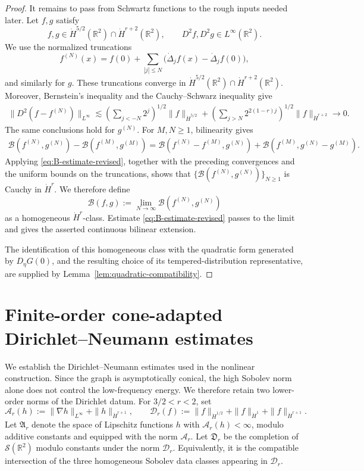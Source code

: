 \documentclass[12pt]{amsart}
\theoremstyle{remark}
\theoremstyle{definition}
\numberwithin{equation}{section}
\newcommand{\R}{\mathbb{R}}
\begin{document}
\begin{proof}
It remains to pass from Schwartz functions to the rough inputs needed
later. Let \(f,g\) satisfy
\[
 f,g\in\dot H^{5/2}(\R^2)\cap\dot H^{r+2}(\R^2),
 \qquad
 D^2f,D^2g\in L^\infty(\R^2).
\]
We use the normalized truncations
\[
 f^{(N)}(x)=f(0)+\sum_{|j|\leq N}
 \bigl(\dot\Delta_jf(x)-\dot\Delta_jf(0)\bigr),
\]
and similarly for \(g\). 
These truncations converge in
\(
 \dot H^{5/2}(\R^2)\cap\dot H^{r+2}(\R^2)
\).
Moreover, Bernstein's inequality and the Cauchy--Schwarz inequality
give
\begin{align*}
 \|D^2(f-f^{(N)})\|_{L^\infty}
 \lesssim \left(
  \sum_{j<-N}2^j \right)^{1/2} \|f\|_{\dot H^{5/2}}+ \left( \sum_{j>N}2^{2(1-r)j}
 \right)^{1/2} \|f\|_{\dot H^{r+2}}
 \longrightarrow 0.
\end{align*}
The same conclusions hold for \(g^{(N)}\). For \(M,N\geq1\), bilinearity gives
\begin{align*}
\mathcal B(f^{(N)},g^{(N)})
 - \mathcal B(f^{(M)},g^{(M)})=
 \mathcal B(f^{(N)}-f^{(M)},g^{(N)})
 + \mathcal B(f^{(M)},g^{(N)}-g^{(M)}).
\end{align*}
Applying \eqref{eq:B-estimate-revised}, together with the preceding
convergences and the uniform bounds on the truncations, shows that \(
 \bigl\{ \mathcal B(f^{(N)},g^{(N)}) \bigr\}_{N\geq1}
\)
is Cauchy in \(\dot H^r\). 
We therefore define
\[
 \mathcal B(f,g) := \lim_{N\to\infty} \mathcal B(f^{(N)},g^{(N)})
\]
as a homogeneous \(\dot H^r\)-class. 
Estimate \eqref{eq:B-estimate-revised} passes to the limit and gives the asserted continuous bilinear extension.

The identification of this homogeneous class with the quadratic form generated by \(D_\eta G(0)\), and the resulting choice of its tempered-distribution representative, are supplied by
Lemma~\ref{lem:quadratic-compatibility}.
\end{proof}


\section{Finite-order cone-adapted Dirichlet--Neumann estimates}
\label{s:finite-order-DN}

We establish the Dirichlet--Neumann estimates used in the nonlinear construction. 
Since the graph is asymptotically conical, the high Sobolev norm alone does not control the low-frequency energy. 
We therefore retain two lower-order norms of the Dirichlet datum.
For \(3/2<r<2\), set
\begin{equation*}
 \mathcal A_r(h) := \|\nabla h\|_{L^\infty} +\|h\|_{\dot H^{r+1}}, \qquad \mathcal D_r(f) := \|f\|_{\dot H^{1/2}} +\|f\|_{\dot H^1} +\|f\|_{\dot H^{r+1}}.
\end{equation*}
Let \(\mathfrak A_r\) denote the space of Lipschitz functions \(h\) with \(\mathcal A_r(h)<\infty\), modulo additive constants and equipped with the norm \(\mathcal A_r\). 
Let \(\mathfrak D_r\) be the completion of \(\mathcal S(\R^2)\) modulo constants under the norm \(\mathcal D_r\).
Equivalently, it is the compatible intersection of the three homogeneous Sobolev data classes appearing in \(\mathcal D_r\).
\end{document}
